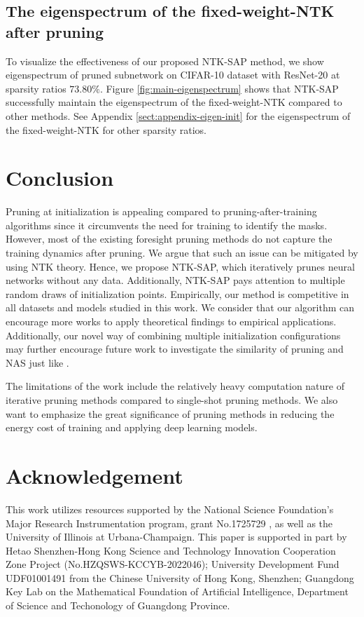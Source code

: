 \documentclass{article} %
\begin{document}
\subsection{The eigenspectrum of the fixed-weight-NTK after pruning}
\label{sect:main-eigen}
To visualize the effectiveness of our proposed NTK-SAP method, we show eigenspectrum of pruned subnetwork on CIFAR-10 dataset with ResNet-20 at sparsity ratios $73.80\%$. Figure \ref{fig:main-eigenspectrum} shows that NTK-SAP successfully maintain the eigenspectrum of the fixed-weight-NTK compared to other methods. See Appendix \ref{sect:appendix-eigen-init} for the eigenspectrum of the fixed-weight-NTK for other sparsity ratios.

\section{Conclusion}
Pruning at initialization is appealing compared to pruning-after-training algorithms since it circumvents the need for training to identify the masks. However, most of the existing foresight pruning methods do not capture the training dynamics after pruning. We argue that such an issue can be mitigated by using NTK theory. Hence, we propose NTK-SAP, which iteratively prunes neural networks without any data. Additionally, NTK-SAP pays attention to multiple random draws of initialization points. Empirically, our method is competitive in all datasets and models studied in this work. We consider that our algorithm can encourage more works to apply theoretical findings to empirical applications. Additionally, our novel way of combining multiple initialization configurations may further encourage future work to investigate the similarity of pruning and NAS just like \citet{liu2018rethinking, zeroproxy}. 

The limitations of the work include the relatively heavy computation nature of iterative pruning methods compared to single-shot pruning methods. We also want to emphasize the great significance of pruning methods in reducing the energy cost of training and applying deep learning models.

\newpage
\section{Acknowledgement}
This work utilizes resources supported by the National Science Foundation’s Major Research Instrumentation program, grant No.1725729 \citep{kindratenko2020hal}, as well as the University of Illinois at Urbana-Champaign. This paper is supported in part by Hetao Shenzhen-Hong Kong Science and Technology Innovation Cooperation Zone Project (No.HZQSWS-KCCYB-2022046); University Development Fund UDF01001491 from the Chinese University of Hong Kong, Shenzhen; Guangdong Key Lab on the Mathematical Foundation of Artificial Intelligence, Department of Science and Techonology of Guangdong Province. 
\end{document}
